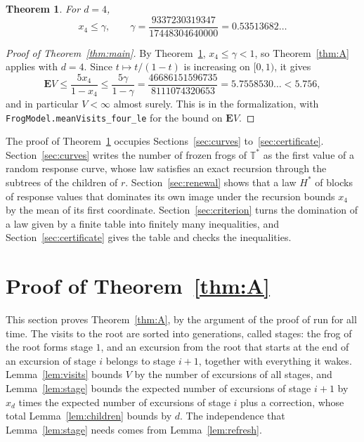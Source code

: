 \documentclass[11pt]{amsart}
\newtheorem{theorem}{Theorem}[section]
\theoremstyle{definition}
\numberwithin{equation}{section}
\newcommand{\lean}[1]{\ignorespaces}
\newcommand{\Ts}{\mathbb{T}^{*}}
\newcommand{\E}{\mathbf{E}}
\newcommand{\cst}{\gamma}
\begin{document}
\begin{theorem}\label{thm:B}\lean{FrogModel.lemmaXFour_of_data, FrogModel.LemmaX.lemmaXFour_of, FrogModel.LemmaX.LemmaXFour, FrogModel.LemmaX.meanHstar_holds}
For $d=4$,
\[
x_4\le\cst,\qquad \cst=\frac{9337230319347}{17448304640000}=0.53513682\ldots
\]
\end{theorem}

\begin{proof}[Proof of Theorem~\ref{thm:main}]
By Theorem~\ref{thm:B}, $x_4\le\cst<1$, so Theorem~\ref{thm:A} applies with $d=4$. Since $t\mapsto t/(1-t)$ is increasing on $[0,1)$, it gives
\[
\E V\le\frac{5x_4}{1-x_4}\le\frac{5\cst}{1-\cst}=\frac{46686151596735}{8111074320653}=5.7558530\ldots<5.756,
\]
and in particular $V<\infty$ almost surely. This is  in the formalization, with \texttt{FrogModel.meanVisits\_four\_le} for the bound on $\E V$.
\end{proof}

The proof of Theorem~\ref{thm:B} occupies Sections~\ref{sec:curves} to~\ref{sec:certificate}. Section~\ref{sec:curves} writes the number of frozen frogs of $\Ts$ as the first value of a random response curve, whose law satisfies an exact recursion through the subtrees of the children of $r$. Section~\ref{sec:renewal} shows that a law $H^*$ of blocks of response values that dominates its own image under the recursion bounds $x_4$ by the mean of its first coordinate. Section~\ref{sec:criterion} turns the domination of a law given by a finite table into finitely many inequalities, and Section~\ref{sec:certificate} gives the table and checks the inequalities.

\section{Proof of Theorem~\ref{thm:A}}\label{sec:thmA}

This section proves Theorem~\ref{thm:A}, by the argument of the proof of \cite[Corollary~4.4]{HJJ19} run for all time. The visits to the root are sorted into generations, called stages: the frog of the root forms stage $1$, and an excursion from the root that starts at the end of an excursion of stage $i$ belongs to stage $i+1$, together with everything it wakes. Lemma~\ref{lem:visits} bounds $V$ by the number of excursions of all stages, and Lemma~\ref{lem:stage} bounds the expected number of excursions of stage $i+1$ by $x_d$ times the expected number of excursions of stage $i$ plus a correction, whose total Lemma~\ref{lem:children} bounds by $d$. The independence that Lemma~\ref{lem:stage} needs comes from Lemma~\ref{lem:refresh}.
\end{document}
